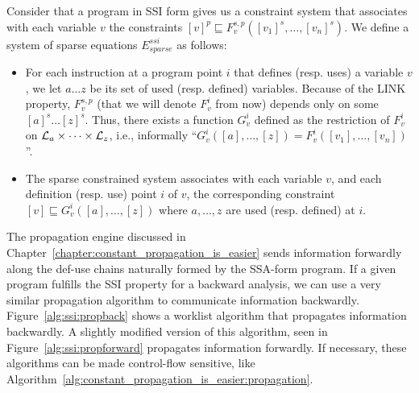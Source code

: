 \begin{definition}
\label{def:ssi_eq}
Consider that a program in SSI form gives us a constraint system that associates with each variable $v$ the constraints $[v]^p \sqsubseteq  F_v^{s,p}([v_1]^s, \dots, [v_n]^s)$. We define a system of sparse equations $E^{\textit{ssi}}_{\textit{sparse}}$ as follows:

\begin{itemize}

\item For each instruction at a program point $i$ that defines (resp. uses) a variable $v$, we let $a \dots z$ be its set of used (resp. defined) variables. Because of the LINK property, $F^{s,p}_v$ (that we will denote $F^i_v$ from now) depends only on some $[a]^s \dots [z]^s$.
Thus, there exists a function $G^i_v$ defined as the restriction of $F^i_v$ on ${\cal L}_a\times \dots \times{\cal L}_z$, i.e., informally ``$G^i_v([a], \dots, [z]) = F^i_v([v_1],\dots, [v_n])$''.
\item The sparse constrained system associates with each variable $v$, and each definition (resp. use) point $i$ of $v$, the corresponding constraint $[v]  \sqsubseteq G_v^i([a], \ldots, [z])$ where $a,\dots, z$ are used (resp. defined) at $i$.
\end{itemize}

\end{definition}

The propagation engine discussed in Chapter~\ref{chapter:constant_propagation_is_easier} sends information forwardly along the def-use chains naturally formed by the SSA-form program.
If a given program fulfills the SSI property for a backward analysis, we can use a very similar propagation algorithm to communicate information backwardly.
Figure~\ref{alg:ssi:propback} shows a worklist algorithm that propagates information backwardly.
A slightly modified version of this algorithm, seen in Figure~\ref{alg:ssi:propforward} propagates information forwardly.
If necessary, these algorithms can be made control-flow sensitive, like Algorithm~\ref{alg:constant_propagation_is_easier:propagation}. 


\def\1{\qquad}
\def\2{\1\1}
\def\3{\2\1}
\def\4{\2\2}
\def\5{\3\2}
\def\6{\4\2}
\def\7{\5\2}
\def\8{\6\2}
\def\9{\7\2}
\def\If{{\sf  if }}
\def\Let{{\sf  let }}
\def\Then{{\sf  then }}
\def\Else{{\sf  else}}
\def\Foreach{{\sf foreach }}
\def\For{{\sf for }}
\def\While{{\sf while }}


